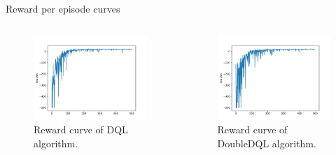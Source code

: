 \documentclass{beamer}
\begin{document}
\begin{frame}{Reward per episode curves}
	\begin{columns}[c] %
		
		\begin{figure}
		\includegraphics[width=\textwidth]{rewards_per_epoch_gdim-16_gamma-0.85_nepisodes-500_explorationstop-0.25_b-32_dql-False}
		\caption{Reward curve of DQL algorithm.}
		\end{figure}
		
		\begin{figure}
		\includegraphics[width=\textwidth]{rewards_per_epoch_gdim-16_gamma-0.85_nepisodes-500_explorationstop-0.25_b-32_dql-True}
		\caption{Reward curve of DoubleDQL algorithm.}
		\end{figure}	

	\end{columns}
\end{frame}
\end{document}
